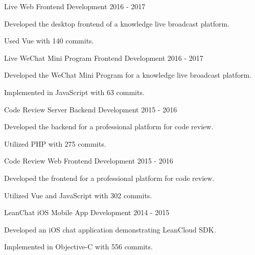 \begin{cventries}
  \cventry
    {Live Web} %
    {Frontend Development} %
    {} %
    {2016 - 2017} %
    {
      \begin{cvitems}
        \item {Developed the desktop frontend of a knowledge live broadcast platform.}
        \item {Used Vue with 140 commits.}
      \end{cvitems}
    }

  \cventry
    {Live WeChat Mini Program} %
    {Frontend Development} %
    {} %
    {2016 - 2017} %
    {
      \begin{cvitems}
        \item {Developed the WeChat Mini Program for a knowledge live broadcast platform.}
        \item {Implemented in JavaScript with 63 commits.}
      \end{cvitems}
    }

  \cventry
    {Code Review Server} %
    {Backend Development} %
    {} %
    {2015 - 2016} %
    {
      \begin{cvitems}
        \item {Developed the backend for a professional platform for code review.}
        \item {Utilized PHP with 275 commits.}
      \end{cvitems}
    }

  \cventry
    {Code Review Web} %
    {Frontend Development} %
    {} %
    {2015 - 2016} %
    {
      \begin{cvitems}
        \item {Developed the frontend for a professional platform for code review.}
        \item {Utilized Vue and JavaScript with 302 commits.}
      \end{cvitems}
    }

  \cventry
    {LeanChat iOS} %
    {Mobile App Development} %
    {} %
    {2014 - 2015} %
    {
      \begin{cvitems}
        \item {Developed an iOS chat application demonstrating LeanCloud SDK.}
        \item {Implemented in Objective-C with 556 commits.}
      \end{cvitems}
    }


\end{cventries}
